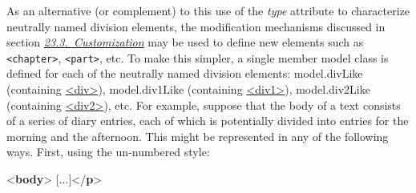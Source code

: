 As an alternative (or complement) to this use of the {\itshape type} attribute to characterize neutrally named division elements, the modification mechanisms discussed in section \textit{\hyperref[MD]{23.3.\ Customization}} may be used to define new elements such as \texttt{<chapter>}, \texttt{<part>}, etc. To make this simpler, a single member model class is defined for each of the neutrally named division elements: \textsf{model.divLike} (containing \hyperref[TEI.div]{<div>}), \textsf{model.div1Like} (containing \hyperref[TEI.div1]{<div1>}), \textsf{model.div2Like} (containing \hyperref[TEI.div2]{<div2>}), etc. For example, suppose that the body of a text consists of a series of diary entries, each of which is potentially divided into entries for the morning and the afternoon. This might be represented in any of the following ways. First, using the un-numbered style: \par\bgroup{}\exampleFont \begin{shaded}\noindent\mbox{}{<\textbf{body}>}\mbox{}\newline 
{}\mbox{}\newline 
\hspace*{1em}\mbox{}\newline 
\hspace*{1em}\hspace*{1em}[...]{</\textbf{p}>}\mbox{}\newline 

\end{shaded}
